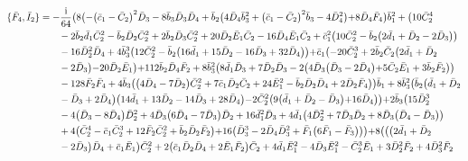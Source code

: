 \documentclass[10pt]{amsart}
\theoremstyle{definition}
\theoremstyle{corollary}
\theoremstyle{remark}
\theoremstyle{conclusion}
\begin{document}
\begin{align}
\{\bar{F}_4, \bar{I}_2\}&=-\frac{{\rm i}}{64} \bigl(8 \bigl(-\bigl(\bar{c}_1-\bar{C}_2\bigl)^2 \bar{D}_3-8 \bar{b}_3 \bar{D}_3 \bar{D}_4+\bar{b}_2 \bigl(4 \bar{D}_4 \bar{b}_3^2+\bigl(\bar{c}_1-\bar{C}_2\bigl)^2 \bar{b}_3-4 \bar{D}_4^2\bigl)+8 \bar{D}_4 \bar{F}_4\bigl) \bar{b}_1^2+\bigl(10 \bar{C}_2^4 \nonumber \\
& \hskip 0.7cm-2 \bar{b}_2 \bar{d}_1 \bar{C}_2^2-\bar{b}_2 \bar{D}_2 \bar{C}_2^2+2 \bar{b}_2 \bar{D}_3 \bar{C}_2^2+20 \bar{D}_2 \bar{E}_1 \bar{C}_2-16 \bar{D}_4 \bar{E}_1 \bar{C}_2+\bar{c}_1^2 \bigl(10 \bar{C}_2^2-\bar{b}_2 \bigl(2 \bar{d}_1+\bar{D}_2-2 \bar{D}_3\bigl)\bigl) \nonumber \\
& \hskip 0.7cm-16 \bar{D}_2^2 \bar{D}_4+4 \bar{b}_3^3 \bigl(12 \bar{C}_2^2-\bar{b}_2 \bigl(16 \bar{d}_1+15 \bar{D}_2-16 \bar{D}_3+32 \bar{D}_4\bigl)\bigl)+\bar{c}_1 \bigl(-20 \bar{C}_2^3+2 \bar{b}_2 \bar{C}_2\bigl(2 \bar{d}_1+\bar{D}_2\nonumber \\
& \hskip 0.7cm-2 \bar{D}_3\bigl) -20 \bar{D}_2 \bar{E}_1\bigl)+112 \bar{b}_2 \bar{D}_4 \bar{F}_2+8 \bar{b}_3^2 \bigl(8 \bar{d}_1 \bar{D}_3+7 \bar{D}_2 \bar{D}_3-2 \bigl(4 \bar{D}_3 \bigl(\bar{D}_3-2 \bar{D}_4\bigl)+5 \bar{C}_2 \bar{E}_1+3 \bar{b}_2 \bar{F}_2\bigl)\bigl) \nonumber \\
& \hskip 0.7cm-128 \bar{F}_2 \bar{F}_4+4 \bar{b}_3 \bigl(\bigl(4 \bar{D}_4-7 \bar{D}_2\bigl) \bar{C}_2^2+7 \bar{c}_1 \bar{D}_2 \bar{C}_2+24 \bar{E}_1^2-\bar{b}_2 \bar{D}_2 \bar{D}_4+2 \bar{D}_2 \bar{F}_4\bigl)\bigl) \bar{b}_1+8 \bar{b}_3^2 \bigl(\bar{b}_2 \bigl(\bar{d}_1+\bar{D}_2 \nonumber \\
& \hskip 0.7cm-\bar{D}_3+2 \bar{D}_4\bigl) \bigl(14 \bar{d}_1+13 \bar{D}_2-14 \bar{D}_3+28 \bar{D}_4\bigl)-2 \bar{C}_2^2 \bigl(9 \bigl(\bar{d}_1+\bar{D}_2-\bar{D}_3\bigl)+16 \bar{D}_4\bigl)\bigl)+2 \bar{b}_3 \bigl(15 \bar{D}_2^3 \nonumber \\
& \hskip 0.7cm-4 \bigl(\bar{D}_3-8 \bar{D}_4\bigl) \bar{D}_2^2+4 \bar{D}_3 \bigl(6 \bar{D}_4-7 \bar{D}_3\bigl) \bar{D}_2+16 \bar{d}_1^2 \bar{D}_3+4 \bar{d}_1 \bigl(4 \bar{D}_2^2+7 \bar{D}_3 \bar{D}_2+8 \bar{D}_3 \bigl(\bar{D}_4-\bar{D}_3\bigl)\bigl) \nonumber \\
& \hskip 0.7cm+4 \bigl(\bar{C}_2^4-\bar{c}_1 \bar{C}_2^3+12 \bar{F}_2 \bar{C}_2^2+\bar{b}_2 \bar{D}_2 \bar{F}_2\bigl)+16 \bigl(\bar{D}_3^3-2 \bar{D}_4 \bar{D}_3^2+\bar{F}_1 \bigl(6 \bar{F}_1-\bar{F}_3\bigl)\bigl)\bigl)+8 \bigl(\bigl(\bigl(2 \bar{d}_1+\bar{D}_2 \nonumber \\
& \hskip 0.7cm-2 \bar{D}_3\bigl) \bar{D}_4+\bar{c}_1 \bar{E}_1\bigl) \bar{C}_2^2+2 \bigl(\bar{c}_1 \bar{D}_2 \bar{D}_4+2 \bar{E}_1 \bar{F}_2\bigl) \bar{C}_2+4 \bar{d}_1 \bar{E}_1^2-4 \bar{D}_3 \bar{E}_1^2-\bar{C}_2^3 \bar{E}_1+3 \bar{D}_2^2 \bar{F}_2+4 \bar{D}_3^2 \bar{F}_2 \nonumber \\

\end{align}
\end{document}
